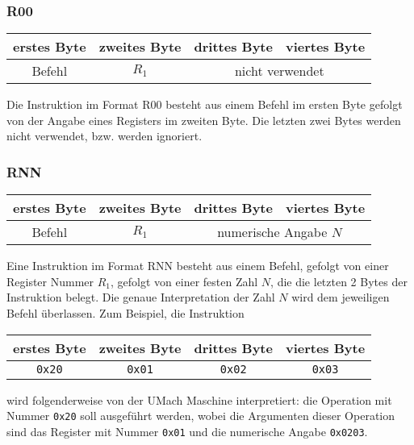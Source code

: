 \subsubsection{R00}
\label{R00}

\begin{center}
  \begin{tabular}{|*{4}{c|}} \hline
    erstes Byte & zweites Byte  & drittes Byte  & viertes Byte   \\\hline\hline
    Befehl      & $R_{1}$ & \multicolumn{2}{c|}{nicht verwendet} \\\hline
  \end{tabular}
\end{center}
Die Instruktion im Format R00 besteht aus einem Befehl im ersten Byte gefolgt
von der Angabe eines Registers im zweiten Byte. Die letzten zwei Bytes werden
nicht verwendet, bzw. werden ignoriert.

\subsubsection{RNN}
\label{RNN}

\begin{center}
  \begin{tabular}{|*{4}{c|}} \hline
    erstes Byte & zweites Byte  & drittes Byte  & viertes Byte   \\\hline\hline
    Befehl      & $R_{1}$ & \multicolumn{2}{c|}{numerische Angabe $N$} \\\hline
  \end{tabular}
\end{center}

Eine Instruktion im Format RNN besteht aus einem Befehl, gefolgt von einer
Register Nummer $R_{1}$, gefolgt von einer festen Zahl $N$, die die letzten
2 Bytes der Instruktion belegt.
Die genaue Interpretation der Zahl $N$ wird dem jeweiligen Befehl überlassen.
Zum Beispiel, die Instruktion
\begin{center}
  \begin{tabular}{|*{4}{c|}} \hline
    erstes Byte & zweites Byte  & drittes Byte  & viertes Byte \\\hline\hline
    \texttt{0x20} & \texttt{0x01} & \texttt{0x02} & \texttt{0x03} \\\hline
  \end{tabular}
\end{center}
wird folgenderweise von der UMach Maschine interpretiert: die Operation mit
Nummer \texttt{0x20} soll ausgeführt werden, wobei die Argumenten dieser
Operation sind das Register mit Nummer \texttt{0x01} und die numerische
Angabe \texttt{0x0203}.



